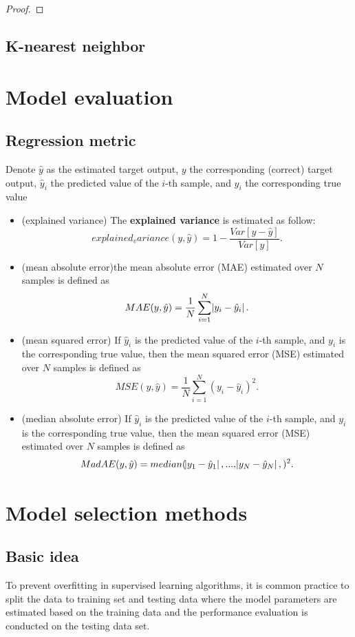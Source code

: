 \begin{refsection}
\begin{proof}
\end{proof}


\subsection{K-nearest neighbor}




\section{Model evaluation}
\subsection{Regression metric}

\begin{definition}
Denote $\hat{y}$ as the estimated target output, $y$ the corresponding (correct) target output, $\hat{y}_i$  the predicted value of the $i$-th sample, and $y_i$ the corresponding true value
\begin{itemize}
	\item (explained variance) The \textbf{explained variance} is estimated as follow:	
	$$explained_variance(y,\hat{y}) = 1 - \frac{Var[y-\hat{y}]}{Var[y]}.$$
	\item (mean absolute error)the mean absolute error (MAE) estimated over $N$ samples is defined as	
	$$MAE(y,\hat{y}) = \frac{1}{N}\sum_{i=1}^{N} \abs{y_i - \hat{y}_i}.$$
	\item (mean squared error) If $\hat{y}_i$ is the predicted value of the $i$-th sample, and $y_i$ is the corresponding true value, then the mean squared error (MSE) estimated over $N$ samples is defined as	
	$$MSE(y,\hat{y}) = \frac{1}{N}\sum_{i=1}^{N} (y_i - \hat{y}_i)^2.$$
	\item (median absolute error) If $\hat{y}_i$ is the predicted value of the $i$-th sample, and $y_i$ is the corresponding true value, then the mean squared error (MSE) estimated over $N$ samples is defined as	
	$$MadAE(y,\hat{y}) = median(\abs{y_1 - \hat{y}_1},...,\abs{y_N - \hat{y}_N},)^2.$$
\end{itemize}	
\end{definition}


\section{Model selection methods}

\subsection{Basic idea}
To prevent overfitting in supervised learning algorithms, it is common practice to split the data to training set and testing data where the model parameters are estimated based on the training data and the performance evaluation is conducted on the testing data set. 


\end{refsection}
